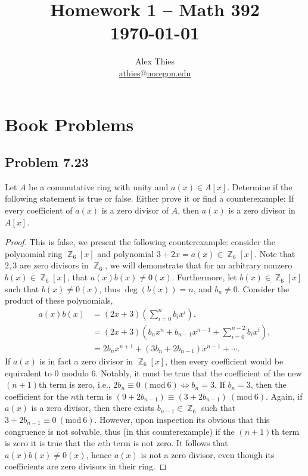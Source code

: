 \documentclass[letterpaper, 12pt]{amsart}
\DeclareMathOperator{\Z}{\mathbb{Z}}
\renewcommand{\mod}[1]{\ (\mathrm{mod}\ #1)}
\begin{document}
	\title{Homework 1  -- Math 392 \\ \today}
	\author{Alex Thies \\ \href{mailto:athies@uoregon.edu}{\lowercase{athies$@$uoregon.edu}}}

	\maketitle

	\section{Book Problems}
	\label{sec:book_problems}
		\subsection*{Problem 7.23}
		\label{sub:problem_7_23}
		Let $A$ be a commutative ring with unity and $a(x) \in A[x]$. 
		Determine if the following statement is true or false. 
		Either prove it or find a counterexample: 
		If every coefficient of $a(x)$ is a zero divisor of $A$, then $a(x)$ is a zero divisor in $A[x]$.
			\begin{proof}
				This is false, we present the following counterexample: consider the polynomial ring $\Z_{6}[x]$ and polynomial $3 + 2x = a(x) \in \Z_{6}[x]$.
				Note that $2,3$ are zero divisors in $\Z_{6}$, we will demonstrate that for an arbitrary nonzero $b(x) \in \Z_{6}[x]$, that $a(x)b(x) \neq 0(x)$.
				Furthermore, let $b(x) \in \Z_{6}[x]$ such that $b(x) \neq 0(x)$, thus $\deg(b(x)) = n$, and $b_{n} \neq 0$.
				Consider the product of these polynomials,
					\begin{align*}
					a(x)b(x) &= (2x + 3)\left( \sum\limits_{i=0}^{n}b_{i}x^{i} \right), \\
					&= (2x + 3)\left( b_{n}x^{n} + b_{n-1}x^{n-1} + \sum\limits_{i=0}^{n-2}b_{i}x^{i} \right), \\
					&= 2b_{n}x^{n+1} + (3b_{n} + 2b_{n-1})x^{n-1} + \cdots.
					\end{align*}
				If $a(x)$ is in fact a zero divisor in $\Z_{6}[x]$, then every coefficient would be equivalent to $0$ modulo $6$.
				Notably, it must be true that the coefficient of the new $(n+1)$th term is zero, i.e., $2b_{n} \equiv 0 \mod{6} \iff b_{n} = 3$.
				If $b_{n} = 3$, then the coefficient for the $n$th term is $(9 + 2b_{n-1}) \equiv (3 + 2b_{n-1}) \mod{6}$.
				Again, if $a(x)$ is a zero divisor, then there exists $b_{n-1} \in \Z_{6}$ such that $3 + 2b_{n-1} \equiv 0 \mod{6}$.
				However, upon inspection its obvious that this congruence is not solvable, thus (in this counterexample) if the $(n+1)$th term is zero it is true that the $n$th term is not zero.
				It follows that $a(x)b(x) \neq 0(x)$, hence $a(x)$ is not a zero divisor, even though its coefficients are zero divisors in their ring.
			\end{proof}
\end{document}
